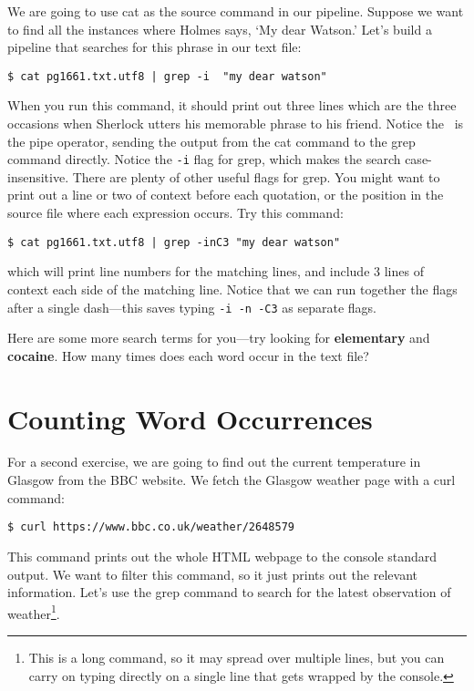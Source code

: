\documentclass{article}
\begin{document}
We are going to use cat as the source command in our pipeline. Suppose we want to find all the instances where Holmes says, `My dear Watson.' Let's build a pipeline that searches for this phrase in our text file:

\begin{lstlisting}[style=BashInputStyle]
    $ cat pg1661.txt.utf8 | grep -i  "my dear watson"
\end{lstlisting}

When you run this command, it should print out three lines which are the three occasions when Sherlock utters his memorable phrase to his friend. Notice the \textbar\ is the pipe operator, sending the output from the cat command to the grep command directly. Notice the \texttt{-i}  flag for grep, which makes the search case-insensitive.
There are plenty of other useful flags for grep. You might want to print out a line or two of context before each quotation, or the position in the source file where each expression occurs. Try this command:

\begin{lstlisting}[style=BashInputStyle]
    $ cat pg1661.txt.utf8 | grep -inC3 "my dear watson"
\end{lstlisting}

which will print line numbers for the matching lines, and include 3 lines of context each side of the matching line. Notice that we can run together the flags after a single dash---this saves typing \texttt{-i -n -C3} as separate flags.

Here are some more search terms for you---try looking for \textbf{elementary} and \textbf{cocaine}. How many times does each word occur in the text file?



\section*{Counting Word Occurrences}

For a second exercise, we are going to find out the current temperature in Glasgow from the BBC website.
We fetch the Glasgow weather page with a curl command:

\begin{lstlisting}[style=BashInputStyle]
    $ curl https://www.bbc.co.uk/weather/2648579
\end{lstlisting}

This command prints out the whole HTML webpage to the console standard output. We want to filter this command, so it just prints out the relevant information. Let's use the grep command to search for the latest observation of weather\footnote{This is a long command, so it may spread over multiple lines, but you can carry on typing directly on a single line that gets wrapped by the console.}.
\end{document}
